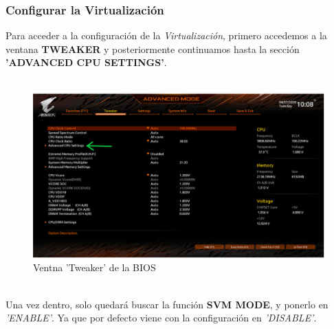 \documentclass{article}
\begin{document}
        \subsubsection{Configurar la Virtualización}
            Para acceder a la configuración de la \textit{Virtualización}, primero accedemos a la ventana \textbf{TWEAKER} y posteriormente continuamos hasta la sección\\ \textbf{'ADVANCED CPU SETTINGS'}.\\\\
            \begin{figure}[h]
              \centering
              \includegraphics[scale = 0.5]{img/tweaker.png}
              \caption{Ventna 'Tweaker' de la BIOS}
            \end{figure}
            \\Una vez dentro, solo quedará buscar la función \textbf{SVM MODE}, y ponerlo en \textit{'ENABLE'}. Ya que por defecto viene con la configuración en \textit{'DISABLE'}.
\end{document}
